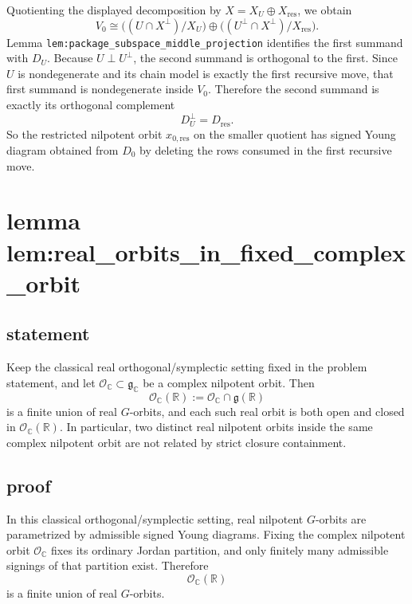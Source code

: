 \documentclass[
]{article}
\begin{document}
Quotienting the displayed decomposition by
\(X=X_U\oplus X_{\mathrm{res}}\), we obtain \[
V_0
\cong
\bigl((U\cap X^\perp)/X_U\bigr)\oplus \bigl((U^\perp\cap X^\perp)/X_{\mathrm{res}}\bigr).
\] Lemma \texttt{lem:package\_subspace\_middle\_projection} identifies
the first summand with \(D_U\). Because \(U\perp U^\perp\), the second
summand is orthogonal to the first. Since \(U\) is nondegenerate and its
chain model is exactly the first recursive move, that first summand is
nondegenerate inside \(V_0\). Therefore the second summand is exactly
its orthogonal complement \[
D_U^\perp=D_{\mathrm{res}}.
\] So the restricted nilpotent orbit \(x_{0,\mathrm{res}}\) on the
smaller quotient has signed Young diagram obtained from \(D_0\) by
deleting the rows consumed in the first recursive move.

\section{lemma
lem:real\_orbits\_in\_fixed\_complex\_orbit}\label{lemma-lemreal_orbits_in_fixed_complex_orbit}

\subsection{statement}\label{statement-19}

Keep the classical real orthogonal/symplectic setting fixed in the
problem statement, and let
\(\mathcal O_{\mathbb C}\subset \mathfrak g_{\mathbb C}\) be a complex
nilpotent orbit. Then \[
\mathcal O_{\mathbb C}(\mathbb R):=\mathcal O_{\mathbb C}\cap \mathfrak g(\mathbb R)
\] is a finite union of real \(G\)-orbits, and each such real orbit is
both open and closed in \(\mathcal O_{\mathbb C}(\mathbb R)\). In
particular, two distinct real nilpotent orbits inside the same complex
nilpotent orbit are not related by strict closure containment.

\subsection{proof}\label{proof-19}

In this classical orthogonal/symplectic setting, real nilpotent
\(G\)-orbits are parametrized by admissible signed Young diagrams.
Fixing the complex nilpotent orbit \(\mathcal O_{\mathbb C}\) fixes its
ordinary Jordan partition, and only finitely many admissible signings of
that partition exist. Therefore \[
\mathcal O_{\mathbb C}(\mathbb R)
\] is a finite union of real \(G\)-orbits.
\end{document}
